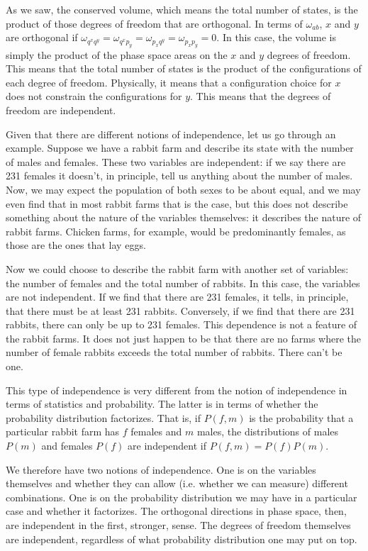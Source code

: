 As we saw, the conserved volume, which means the total number of states, is the product of those degrees of freedom that are orthogonal. In terms of $\omega_{ab}$, $x$ and $y$ are orthogonal if $\omega_{q^x q^y} = \omega_{q^x p_y} = \omega_{p_x q^y} = \omega_{p_x p_y} = 0$. In this case, the volume is simply the product of the phase space areas on the $x$ and $y$ degrees of freedom. This means that the total number of states is the product of the configurations of each degree of freedom. Physically, it means that a configuration choice for $x$ does not constrain the configurations for $y$. This means that the degrees of freedom are independent.

Given that there are different notions of independence, let us go through an example. Suppose we have a rabbit farm and describe its state with the number of males and females. These two variables are independent: if we say there are 231 females it doesn't, in principle, tell us anything about the number of males. Now, we may expect the population of both sexes to be about equal, and we may even find that in most rabbit farms that is the case, but this does not describe something about the nature of the variables themselves: it describes the nature of rabbit farms. Chicken farms, for example, would be predominantly females, as those are the ones that lay eggs.

Now we could choose to describe the rabbit farm with another set of variables: the number of females and the total number of rabbits. In this case, the variables are not independent. If we find that there are 231 females, it tells, in principle, that there must be at least 231 rabbits. Conversely, if we find that there are 231 rabbits, there can only be up to 231 females. This dependence is not a feature of the rabbit farms. It does not just happen to be that there are no farms where the number of female rabbits exceeds the total number of rabbits. There can't be one.

This type of independence is very different from the notion of independence in terms of statistics and probability. The latter is in terms of whether the probability distribution factorizes. That is, if $P(f,m)$ is the probability that a particular rabbit farm has $f$ females and $m$ males, the distributions of males $P(m)$ and females $P(f)$ are independent if $P(f,m) = P(f) P(m)$. 

We therefore have two notions of independence. One is on the variables themselves and whether they can allow (i.e. whether we can measure) different combinations. One is on the probability distribution we may have in a particular case and whether it factorizes. The orthogonal directions in phase space, then, are independent in the first, stronger, sense. The degrees of freedom themselves are independent, regardless of what probability distribution one may put on top.

